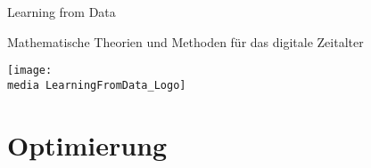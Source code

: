 \documentclass{newlayout}
\newcommand{\media}{media/}
\begin{document}
%
\setcounter{page}{3}

\setcounter{tocdepth}{1}
\tableofcontents

\setcounter{secnumdepth}{1}

\setcounter{page}{7}
\setcounter{chapter}{0}


\begin{coursetitle}
  \centerline{Learning from Data} 
  \bigskip
  \Large \centerline{Mathematische Theorien und Methoden für das digitale Zeitalter}
  \bigskip
 \texttt{[image: \\media LearningFromData\_Logo]}
 \label{fig:titelbild}
  \bigskip
\end{coursetitle}










\section{Optimierung}







%
\end{document}
